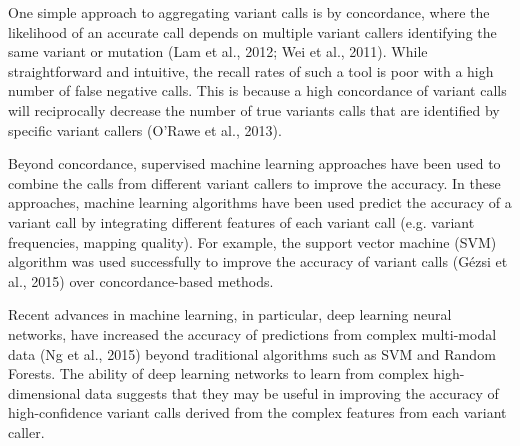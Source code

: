 \documentclass{article}
\begin{document}
One simple approach to aggregating variant calls is by concordance, where the likelihood of an accurate call depends on multiple variant callers identifying the same variant or mutation (Lam et al., 2012; Wei et al., 2011). While straightforward and intuitive, the recall rates of such a tool is poor with a high number of false negative calls. This is because a high concordance of variant calls will reciprocally decrease the number of true variants calls that are identified by specific variant callers (O'Rawe et al., 2013).

Beyond concordance, supervised machine learning approaches have been used to combine the calls from different variant callers to improve the accuracy. In these approaches, machine learning algorithms have been used predict the accuracy of a variant call by integrating different features of each variant call (e.g. variant frequencies, mapping quality). For example, the support vector machine (SVM) algorithm was used successfully to improve the accuracy of variant calls (Gézsi et al., 2015) over concordance-based methods. 

Recent advances in machine learning, in particular, deep learning neural networks, have increased the accuracy of predictions from complex multi-modal data (Ng et al., 2015) beyond traditional algorithms such as SVM and Random Forests. The ability of deep learning networks to learn from complex high-dimensional data suggests that they may be useful in improving the accuracy of high-confidence variant calls derived from the complex features from each variant caller. 
\end{document}
